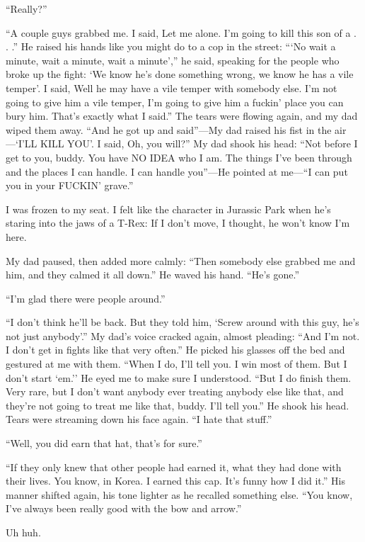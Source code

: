 \documentclass[12pt]{book}
\begin{document}
``Really?''

``A couple guys grabbed me. I said, Let me alone. I'm going to kill this son of a . . .'' He raised his hands like you might do to a cop in the street: ```No wait a minute, wait a minute, wait a minute','' he said, speaking for the people who broke up the fight: `We know he's done something wrong, we know he has a vile temper'. I said, Well he may have a vile temper with somebody else. I'm not going to give him a vile temper, I'm going to give him a fuckin' place you can bury him. That's exactly what I said.'' The tears were flowing again, and my dad wiped them away. ``And he got up and said''---My dad raised his fist in the air---`I'LL KILL YOU'. I said, Oh, you will?'' My dad shook his head: ``Not before I get to you, buddy. You have NO IDEA who I am. The things I've been through and the places I can handle. I can handle you''---He pointed at me---``I can put you in your FUCKIN' grave.''

I was frozen to my seat. I felt like the character in Jurassic Park when he's staring into the jaws of a T-Rex: If I don't move, I thought, he won't know I'm here.

My dad paused, then added more calmly: ``Then somebody else grabbed me and him, and they calmed it all down.'' He waved his hand. ``He's gone.''

``I'm glad there were people around.''

``I don't think he'll be back. But they told him, `Screw around with this guy, he's not just anybody'.'' My dad's voice cracked again, almost pleading: ``And I'm not. I don't get in fights like that very often.'' He picked his glasses off the bed and gestured at me with them. ``When I do, I'll tell you. I win most of them. But I don't start `em.'' He eyed me to make sure I understood. ``But I do finish them. Very rare, but I don't want anybody ever treating anybody else like that, and they're not going to treat me like that, buddy. I'll tell you.'' He shook his head. Tears were streaming down his face again. ``I hate that stuff.''

``Well, you did earn that hat, that's for sure.''

``If they only knew that other people had earned it, what they had done with their lives. You know, in Korea. I earned this cap. It's funny how I did it.'' His manner shifted again, his tone lighter as he recalled something else. ``You know, I've always been really good with the bow and arrow.''

Uh huh.
\end{document}

